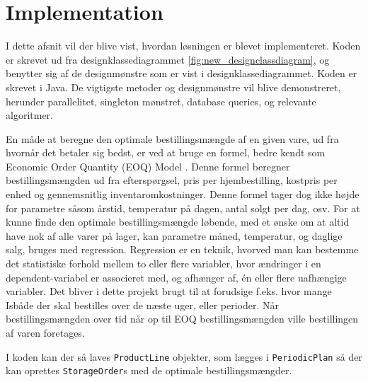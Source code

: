 \chapter{Implementation}\label{ch:implementation}
I dette afsnit vil der blive vist, hvordan løsningen er blevet implementeret. Koden er skrevet ud fra designklassediagrammet \ref{fig:new_designclassdiagram}, og benytter sig af de designmønstre som er vist i designklassediagrammet. Koden er skrevet i Java. 
De vigtigste metoder og designmønstre vil blive demonstreret, herunder parallelitet, singleton mønstret, database queries, og relevante algoritmer.




En måde at beregne den optimale bestillingsmængde af en given vare, ud fra hvornår det betaler sig bedst, er ved at bruge en formel, bedre kendt som Economic Order Quantity (EOQ) Model \cite{EOQ}. Denne formel beregner bestillingsmængden ud fra efterspørgsel, pris per hjembestilling, kostpris per enhed og gennemsnitlig inventaromkostninger. Denne formel tager dog ikke højde for parametre såsom årstid, temperatur på dagen, antal solgt per dag, osv. For at kunne finde den optimale bestillingsmængde løbende, med et ønske om at altid have nok af alle varer på lager, kan parametre måned, temperatur, og daglige salg, bruges med regression. Regression er en teknik, hvorved man kan bestemme det statistiske forhold mellem to eller flere variabler, hvor ændringer i en dependent-variabel er associeret med, og afhænger af, én eller flere uafhængige variabler. Det bliver i dette projekt brugt til at forudsige f.eks. hvor mange Isbåde\cite{Isbåd} der skal bestilles over de næste uger, eller perioder. Når bestillingsmængden over tid når op til EOQ bestillingsmængden ville bestillingen af varen foretages.


I koden kan der så laves \verb|ProductLine| objekter, som lægges i \verb|PeriodicPlan| så der kan oprettes \verb|StorageOrder|s med de optimale bestillingsmængder. 

